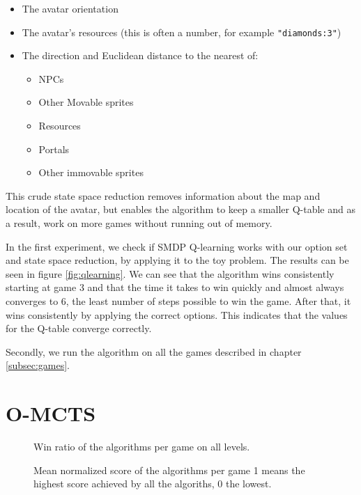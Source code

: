 \begin{itemize}
	\item The avatar orientation
	\item The avatar's resources (this is often a number, for example
		\texttt{"diamonds:3"})
	\item The direction and Euclidean distance to the nearest of:
		\begin{itemize}
			\item NPCs
			\item Other Movable sprites
			\item Resources
			\item Portals
			\item Other immovable sprites
		\end{itemize}
\end{itemize}

This crude state space reduction removes information about the map and location
of the avatar, but enables the algorithm to keep a smaller Q-table and as a
result, work on more games without running out of memory.

In the first experiment, we check if SMDP Q-learning works with our option set
and state space reduction, by applying it to the toy problem. The results can be
seen in figure \ref{fig:qlearning}. We can see that the algorithm wins
consistently starting at game 3 and that the time it takes to win quickly and
almost always converges to 6, the least number of steps possible to win the
game. After that, it wins consistently by applying the correct options. This
indicates that the values for the Q-table converge correctly.

Secondly, we run the algorithm on all the games described in chapter  
\ref{subsec:games}. 

\section{O-MCTS}
\label{subsec:omcts}
\begin{figure}
	\centering
	\vspace{-.8cm}
	\caption{Win ratio of the algorithms per game on all levels.}
	\label{fig:wins}
	\centering
	\vspace{-.8cm}
	\caption{Mean normalized score of the algorithms per game 1 means the
	highest score achieved by all the algoriths, 0 the lowest.}
	\label{fig:scores}
\end{figure}


